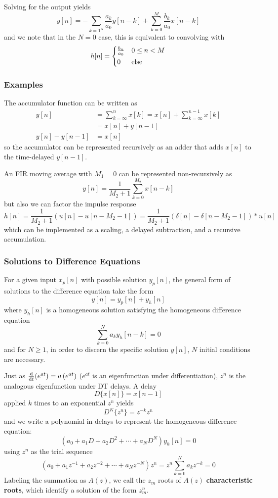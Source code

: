 \documentclass{article}
\begin{document}
Solving for the output yields
\begin{equation}\label{eq:difference-solved}
	y[n] = -\sum_{k=1^N}\frac{a_k}{a_0}y[n-k] + \sum_{k=0}^M \frac{b_k}{a_0}x[n-k]
\end{equation}
and we note that in the $N=0$ case, this is equivalent to convolving with \[
    h[n] = \begin{cases*}
        \frac{b_n}{a_0} & $0\le n < M$\\
        0 & else
    \end{cases*}
\]

\subsubsection{Examples}
The accumulator function can be written as
\begin{align}
	y[n] &= \sum_{k=\infty}^n x[k] = x[n] + \sum_{k=\infty}^{n-1} x[k]\\
	     &= x[n] + y[n-1]\\
	y[n]-y[n-1] &= x[n]
\end{align}
so the accumulator can be represented recursively as an adder that adds $x[n]$ to the time-delayed $y[n-1]$.

An FIR moving average with $M_1=0$ can be represented non-recursively as
\[
    y[n] = \frac{1}{M_2+1}\sum_{k=0}^{M_2}x[n-k]
\]
but also we can factor the impulse response
\[
    h[n] = \frac{1}{M_2+1}\left(u[n]-u[n-M_2-1]\right)
         = \frac{1}{M_2+1}\left(\delta[n]-\delta[n-M_2-1]\right)*u[n]
\]
which can be implemented as a scaling, a delayed subtraction, and a recursive accumulation.

\subsubsection{Solutions to Difference Equations}
For a given input $x_p[n]$ with possible solution $y_p[n]$, the general form of solutions to the difference equation take the form
\[
    y[n] = y_p[n] + y_h[n]
\]
where $y_h[n]$ is a homogeneous solution satisfying the homogeneous difference equation
\[
    \sum_{k=0}^N a_k y_h[n-k]=0
\]
and for $N\ge1$, in order to discern the specific solution $y[n]$, $N$ initial conditions are necessary.

Just as $\dv{t}(e^{at})=a\left(e^{at}\right)$ ($e^{at}$ is an eigenfunction under differentiation), $z^n$ is the analogous eigenfunction under DT delays. A delay \[
    D\{x[n]\} = x[n-1]
\] applied $k$ times to an exponential $z^n$ yields \[
    D^K\{z^n\} =z^{-k}z^n
\]
and we write a polynomial in delays to represent the homogeneous difference equation:
\[
    (a_0+a_1D+a_2D^2+\cdots+a_ND^N)y_h[n]=0
\]
using $z^n$ as the trial sequence
\[
    (a_0+a_1z^{-1}+a_2z^{-2}+\cdots+a_Nz^{-N})z^n = z^n\sum_{k=0}^N a_kz^{-k} =0
\]
Labeling the summation as $A(z)$, we call the $z_m$ roots of $A(z)$ \textbf{characteristic roots}, which identify a solution of the form $z^n_m$.
\end{document}
